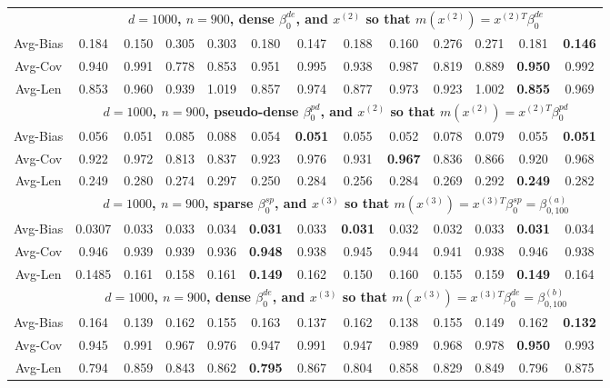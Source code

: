 \documentclass[ejsv2,noshowframe]{imsart}
\theoremstyle{plain}
\theoremstyle{definition}
\theoremstyle{remark}
\begin{document}
\begin{table}[hbtp!]
\begin{center}
{\begin{tabular}{ccccccccccccc}
				& \multicolumn{12}{c}{\bf $d=1000$, $n = 900$, dense $\beta_0^{de}$, and $x^{(2)}$ so that $m(x^{(2)})=x^{(2)T}\beta_0^{de}$} \\ \cline{2-13}
				Avg-Bias & 0.184 & 0.150 & 0.305 & 0.303 & 0.180 & 0.147 & 0.188 & 0.160 & 0.276 & 0.271 & 0.181 & {\bf 0.146} \\
				Avg-Cov & 0.940 & 0.991 & 0.778 & 0.853 & 0.951 & 0.995 & 0.938 & 0.987 & 0.819 & 0.889 & {\bf 0.950} & 0.992 \\
				Avg-Len & 0.853 & 0.960 & 0.939 & 1.019 & 0.857 & 0.974 & 0.877 & 0.973 & 0.923 & 1.002 & {\bf 0.855} & 0.969 \\
				\cline{2-13}
				
				& \multicolumn{12}{c}{\bf $d=1000$, $n = 900$, pseudo-dense $\beta_0^{pd}$, and $x^{(2)}$ so that $m(x^{(2)})=x^{(2)T}\beta_0^{pd}$} \\ \cline{2-13}
				Avg-Bias & 0.056 & 0.051 & 0.085 & 0.088 & 0.054 & {\bf 0.051} & 0.055 & 0.052 & 0.078 & 0.079 & 0.055 & {\bf 0.051} \\
				Avg-Cov & 0.922 & 0.972 & 0.813 & 0.837 & 0.923 & 0.976 & 0.931 & {\bf 0.967} & 0.836 & 0.866 & 0.920 & 0.968 \\
				Avg-Len & 0.249 & 0.280 & 0.274 & 0.297 & 0.250 & 0.284 & 0.256 & 0.284 & 0.269 & 0.292 & {\bf 0.249} & 0.282 \\
				\hline
				
				& \multicolumn{12}{c}{\bf $d=1000$, $n = 900$, sparse $\beta_0^{sp}$, and $x^{(3)}$ so that $m(x^{(3)})=x^{(3)T}\beta_0^{sp} = \beta_{0,100}^{(a)}$} \\ \cline{2-13}
				Avg-Bias & 0.0307 & 0.033 & 0.033 & 0.034 & {\bf 0.031} & 0.033 & {\bf 0.031} & 0.032 & 0.032 & 0.033 & {\bf 0.031} & 0.034 \\
				Avg-Cov & 0.946 & 0.939 & 0.939 & 0.936 & {\bf 0.948} & 0.938 & 0.945 & 0.944 & 0.941 & 0.938 & 0.946 & 0.938 \\
				Avg-Len & 0.1485 & 0.161 & 0.158 & 0.161 & {\bf 0.149} & 0.162 & 0.150 & 0.160 & 0.155 & 0.159 & {\bf 0.149} & 0.164 \\
				\cline{2-13}
				
				& \multicolumn{12}{c}{\bf $d=1000$, $n = 900$, dense $\beta_0^{de}$, and $x^{(3)}$ so that $m(x^{(3)})=x^{(3)T}\beta_0^{de} = \beta_{0,100}^{(b)}$} \\ \cline{2-13}
				Avg-Bias & 0.164 & 0.139 & 0.162 & 0.155 & 0.163 & 0.137 & 0.162 & 0.138 & 0.155 & 0.149 & 0.162 & {\bf 0.132} \\
				Avg-Cov & 0.945 & 0.991 & 0.967 & 0.976 & 0.947 & 0.991 & 0.947 & 0.989 & 0.968 & 0.978 & {\bf 0.950} & 0.993 \\
				Avg-Len & 0.794 & 0.859 & 0.843 & 0.862 & {\bf 0.795} & 0.867 & 0.804 & 0.858 & 0.829 & 0.849 & 0.796 & 0.875 \\
				\cline{2-13}
				

\end{tabular}}
\end{center}
\end{table}
\end{document}
